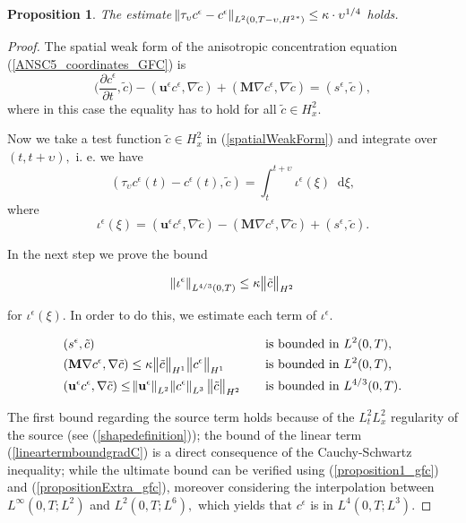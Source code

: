 \documentclass[12pt]{report}
\numberwithin{theorem}{chapter}
\numberwithin{corollary}{chapter}
\numberwithin{lemma}{chapter}
\numberwithin{remark}{chapter}
\numberwithin{definition}{chapter}
\newtheorem{prop}{Proposition}
\numberwithin{prop}{chapter}
\newcommand*\diff{\mathop{}\!\mathrm{d}}
\begin{document}
\begin{prop}
The estimate $\norm{\tau_\upsilon c^\epsilon - c^\epsilon}_{L^2(0,T-\upsilon, {H^2}^*)} \leq \kappa \cdot \upsilon^{1/4}$ holds.
\end{prop}

\begin{proof}
The spatial weak form of the anisotropic concentration equation (\ref{ANSC5_coordinates_GFC}) is
%
\begin{equation} \bigg (\frac{\partial c^\epsilon}{\partial t}, \tilde{c} \bigg ) - (\mathbf{u}^\epsilon c^\epsilon, \nabla \tilde{c}) + (\mathbf{M} \nabla c^\epsilon, \nabla \tilde{c}) = (s^\epsilon, \tilde{c}), \label{spatialWeakForm}
\end{equation}
%
where in this case the equality has to hold for all $\tilde{c} \in H^2_x.$

Now we take a test function $\tilde{c} \in H^2_x$  in (\ref{spatialWeakForm}) and integrate over $(t, t+\upsilon),$ i. e. we have
%
\[ (\tau_\upsilon c^\epsilon (t) - c^\epsilon (t), \tilde{c}) = \int_t^{t+\upsilon} \iota^\epsilon (\xi) \diff \xi,\]
%
where
%
\[ \iota^\epsilon (\xi) = (\mathbf{u}^\epsilon c^\epsilon, \nabla \tilde{c}) - (\mathbf{M} \nabla c^\epsilon, \nabla \tilde{c}) + (s^\epsilon, \tilde{c}). \]

In the next step we prove the bound

\begin{equation} \norm{\iota^\epsilon}_{L^{4/3}(0,T)} \leq \kappa \big \| \tilde{c} \big \| _{H^2} \label{bound_iota} \end{equation}

for $\iota^\epsilon(\xi)$. In order to do this, we estimate each term of $\iota^\epsilon.$

\begin{align} 
  &  (s^\epsilon, \tilde{c}) &\quad & \text{is bounded in $L^2(0,T)$,}  \\ 
  & \label{lineartermboundgradC} (\mathbf{M} \nabla c^\epsilon, \nabla \tilde{c}) \leq \kappa \big \| \tilde{c} \big \| _{H^1} \big \| c^\epsilon \big \| _{H^1} &\quad & \text{is bounded in $L^2(0,T)$,}  \\
  & (\mathbf{u}^\epsilon c^\epsilon, \nabla \tilde{c}) \leq \norm{\mathbf{u}^\epsilon}_{L^2} \norm{c^\epsilon}_{L^3}  \big \| \tilde{c} \big \| _{H^2} &\quad & \text{is bounded in $L^{4/3}(0,T).$}
\end{align} 

The first bound regarding the source term holds because of the $L^2_t L^2_x$ regularity of the source (see (\ref{shapedefinition})); the bound of the linear term (\ref{lineartermboundgradC}) is a direct consequence of the Cauchy-Schwartz inequality; while the ultimate bound can be verified using (\ref{proposition1_gfc}) and (\ref{propositionExtra_gfc}), moreover considering the interpolation between $L^\infty(0,T; L^2)$ and $L^2(0,T; L^6),$ which yields that $c^\epsilon$ is in $L^4(0,T; L^3)$.


\end{proof}
\end{document}

